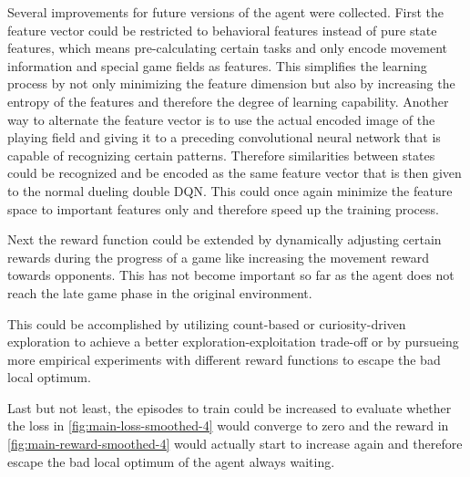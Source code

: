Several improvements for future versions of the agent were collected. First the feature vector could be restricted to behavioral features instead of pure state features, which means pre-calculating certain tasks and only encode movement information and special game fields as features. This simplifies the learning process by not only minimizing the feature dimension but also by increasing the entropy of the features and therefore the degree of learning capability. Another way to alternate the feature vector is to use the actual encoded image of the playing field and giving it to a preceding convolutional neural network that is capable of recognizing certain patterns. Therefore similarities between states could be recognized and be encoded as the same feature vector that is then given to the normal dueling double DQN. This could once again minimize the feature space to important features only and therefore speed up the training process. 

Next the reward function could be extended by dynamically adjusting certain rewards during the progress of a game like increasing the movement reward towards opponents. This has not become important so far as the agent does not reach the late game phase in the original environment. 

This could be accomplished by utilizing count-based or curiosity-driven exploration to achieve a better exploration-exploitation trade-off or by pursueing more empirical experiments with different reward functions to escape the bad local optimum. 

Last but not least, the episodes to train could be increased to evaluate whether the loss in \autoref{fig:main-loss-smoothed-4} would converge to zero and the reward in \autoref{fig:main-reward-smoothed-4} would actually start to increase again and therefore escape the bad local optimum of the agent always waiting. 



